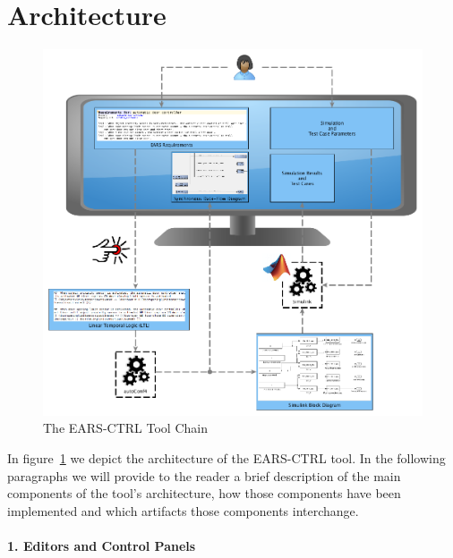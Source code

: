 \section{Architecture}

\begin{figure}[t]
   \begin{center}
     \includegraphics[width=1\textwidth]{images/toolchain.png}
     \caption{The \textsf{EARS-CTRL} Tool Chain}
     \label{fig:ears_ctrl_toolchain}
   \end{center}
 \end{figure}
 
In figure~\ref{fig:ears_ctrl_toolchain} we depict the architecture of the
\textsf{EARS-CTRL} tool. In the following paragraphs we will provide to the
reader a brief description of the main components of the tool's architecture,
how those components have been implemented and which artifacts those
components interchange. 
 
\paragraph{1. Editors and Control Panels\\\\} 

